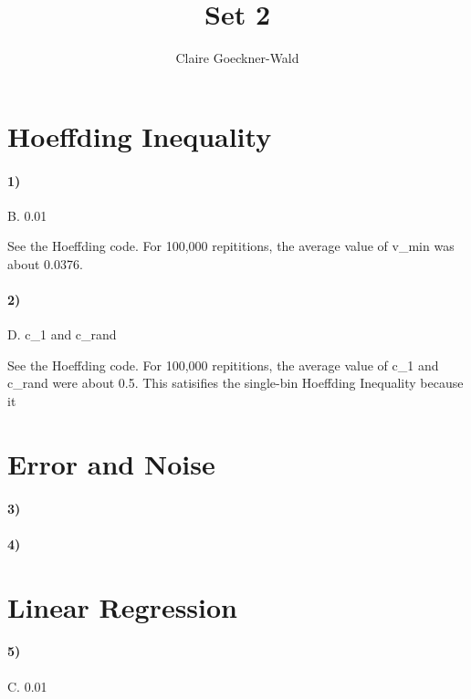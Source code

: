 \documentclass[10pt,letter]{article}
\begin{document}
\title{Set 2}
\author{Claire Goeckner-Wald}
\maketitle 

\section*{Hoeffding Inequality}

\paragraph{1)} B. 0.01

	See the Hoeffding code. For 100,000 repititions, the average value of v_min was about 0.0376.

\paragraph{2)} D. c_1 and c_rand

	See the Hoeffding code. For 100,000 repititions, the average value of c_1 and c_rand were about 0.5. This satisifies the single-bin Hoeffding Inequality because it 

\section*{Error and Noise}

\paragraph{3)}

\paragraph{4)}

\section*{Linear Regression}

\paragraph{5)} C. 0.01
\end{document}
